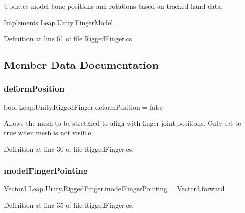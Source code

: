Updates model bone positions and rotations based on tracked hand data. 



Implements \mbox{\hyperlink{class_leap_1_1_unity_1_1_finger_model_a9103f063172a8f99a9aa083407ada2a2}{Leap.\+Unity.\+Finger\+Model}}.



Definition at line 61 of file Rigged\+Finger.\+cs.



\subsection{Member Data Documentation}
\mbox{\label{class_leap_1_1_unity_1_1_rigged_finger_a50f0aac12192993f685d07c551e40151}} 
\subsubsection{\texorpdfstring{deformPosition}{deformPosition}}
{\footnotesize\ttfamily bool Leap.\+Unity.\+Rigged\+Finger.\+deform\+Position = false}



Allows the mesh to be stretched to align with finger joint positions. Only set to true when mesh is not visible. 



Definition at line 30 of file Rigged\+Finger.\+cs.

\mbox{\label{class_leap_1_1_unity_1_1_rigged_finger_a43e360635499f70bc13722e363599c91}} 
\subsubsection{\texorpdfstring{modelFingerPointing}{modelFingerPointing}}
{\footnotesize\ttfamily Vector3 Leap.\+Unity.\+Rigged\+Finger.\+model\+Finger\+Pointing = Vector3.\+forward}



Definition at line 35 of file Rigged\+Finger.\+cs.

